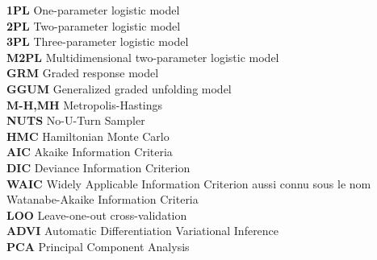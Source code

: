 \textbf{1PL}\hspace{0.5cm}  One-parameter logistic model\\
\textbf{2PL}\hspace{0.5cm}  Two-parameter logistic model\\
\textbf{3PL}\hspace{0.5cm}  Three-parameter logistic model\\
\textbf{M2PL}\hspace{0.5cm}  Multidimensional two-parameter logistic model\\
\textbf{GRM}\hspace{0.5cm}  Graded response model\\
\textbf{GGUM}\hspace{0.5cm}  Generalized graded unfolding model\\
\textbf{M-H,MH }\hspace{0.5cm}  Metropolis-Hastings\\
\textbf{NUTS}\hspace{0.5cm}  No-U-Turn Sampler\\
\textbf{HMC}\hspace{0.5cm}  Hamiltonian Monte Carlo\\
\textbf{AIC}\hspace{0.5cm} Akaike Information Criteria\\
\textbf{DIC}\hspace{0.5cm} Deviance Information Criterion\\
\textbf{WAIC}\hspace{0.5cm} Widely Applicable Information Criterion aussi connu sous le nom Watanabe-Akaike Information Criteria\\
\textbf{LOO}\hspace{0.5cm}  Leave-one-out cross-validation\\
\textbf{ADVI}\hspace{0.5cm}  Automatic Differentiation Variational Inference\\
\textbf{PCA}\hspace{0.5cm}  Principal Component Analysis\\


